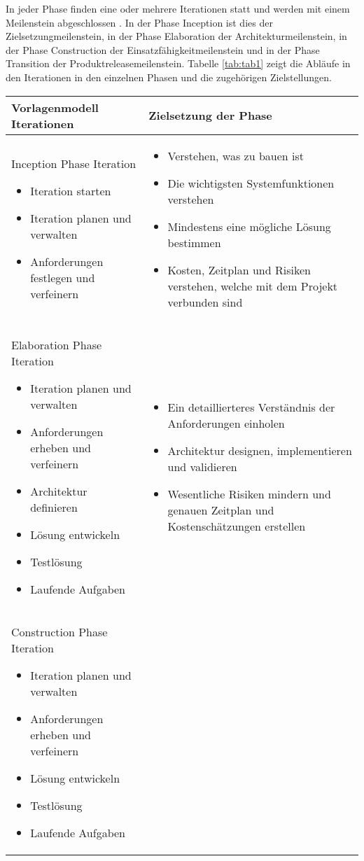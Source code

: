 In jeder Phase finden eine oder mehrere Iterationen statt und werden mit einem Meilenstein abgeschlossen \cite{Basem2010}. In der Phase Inception ist dies der Zielsetzungmeilenstein, in der Phase Elaboration der Architekturmeilenstein, in der Phase Construction der Einsatzfähigkeitmeilenstein und in der Phase Transition der Produktreleasemeilenstein. Tabelle \ref{tab:tab1} zeigt die Abläufe in den Iterationen in den einzelnen Phasen und die zugehörigen Zielstellungen.
\begin{longtable}{|p{7cm}|p{8cm}|}
\hline
Vorlagenmodell Iterationen & Zielsetzung der Phase \\
\hline
Inception Phase Iteration 
\begin {itemize}
\item Iteration starten 
 \item  Iteration planen und verwalten
 \item  Anforderungen festlegen und verfeinern 
  \end{itemize}
   &
  
  \begin {itemize}
\item Verstehen, was zu bauen ist
 \item Die wichtigsten Systemfunktionen verstehen 
\item Mindestens eine mögliche Lösung bestimmen
\item Kosten, Zeitplan und Risiken verstehen, welche mit dem Projekt verbunden sind
  \end{itemize}

 \\
\hline
 Elaboration Phase Iteration 
   \begin {itemize}
   \item Iteration planen und verwalten
   \item Anforderungen erheben und verfeinern
   \item Architektur definieren
   \item Lösung entwickeln
   \item Testlösung
   \item Laufende Aufgaben
   
  \end{itemize}

  & 
     \begin {itemize}
   \item Ein detaillierteres Verständnis der Anforderungen einholen
   \item Architektur designen, implementieren und validieren
   \item  Wesentliche Risiken mindern und genauen Zeitplan und Kostenschätzungen erstellen
    \end{itemize}
 \\
\hline
\hline
Construction Phase Iteration 
   \begin {itemize}
   \item Iteration planen und verwalten
   \item Anforderungen erheben und verfeinern
     \item Lösung entwickeln
   \item Testlösung
   \item Laufende Aufgaben


\end{itemize}
\end{longtable}
